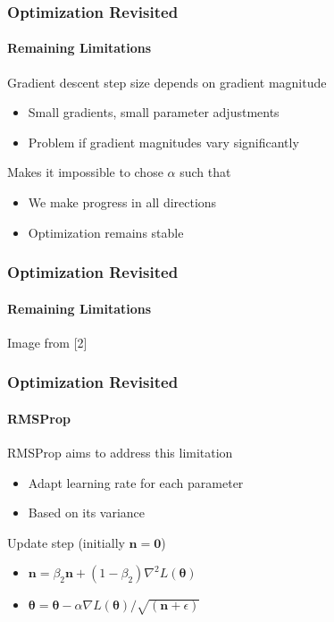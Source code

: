 \documentclass[xetex,professionalfont]{beamer}
\renewcommand\emph[1]{\textcolor{tuwcvl_cvl_blue}{#1}}
\renewcommand{\vec}[1]{\ensuremath{\mathbf{#1}}}
\newcommand{\vn}{\vec{n}}
\newcommand{\bth}{\boldsymbol{\theta}}
\begin{document}
\begin{frame}
  \frametitle{Optimization Revisited}
  \framesubtitle{Remaining Limitations}

  Gradient descent step size depends on gradient magnitude
  \begin{itemize}
    \item Small gradients, small parameter adjustments
    \item Problem if gradient magnitudes vary significantly
\end{itemize}

\bigskip

Makes it impossible to chose $\alpha$ such that
\begin{itemize}
\item We make progress in all directions
\item Optimization remains stable
\end{itemize}

  \end{frame}


\begin{frame}
  \frametitle{Optimization Revisited}
  \framesubtitle{Remaining Limitations}
  
  \begin{center}
  {\centering Image from [2]}
  \end{center}
  
  \end{frame}


\begin{frame}
\frametitle{Optimization Revisited}
\framesubtitle{RMSProp}

\emph{RMSProp} aims to address this limitation
\begin{itemize}
  \item Adapt learning rate for each parameter
  \item Based on its variance
\end{itemize}


\bigskip

Update step (initially $\vn=\vec{0}$)
\begin{itemize}
    \item $\vn=\beta_2\vn+(1-\beta_2)\nabla^2 L(\bth)$ %
    \item $\bth=\bth-\alpha \nabla L(\bth) / \sqrt{(\vn+\epsilon)}$ %
\end{itemize}

\end{frame}
\end{document}
